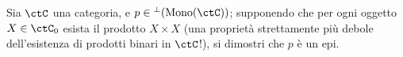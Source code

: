 \begin{examples}
\end{examples}
\begin{esercizi}
 \item \label{eser_facsys_81_1} Sia \(\ctC\) una categoria, e \(p\in\lort(\Mono[\ctC])\); supponendo che per ogni oggetto \(X\in\ctC_0\) esista il prodotto \(X\times X\) (una proprietà strettamente più debole dell'esistenza di prodotti binari in \(\ctC\)!), si dimostri che \(p\) è un epi.
 \item \label{eser_facsys_81_2}
 \item \label{eser_facsys_81_3}
 \item \label{eser_facsys_81_4}
 \item \label{eser_facsys_81_5}
\end{esercizi}

